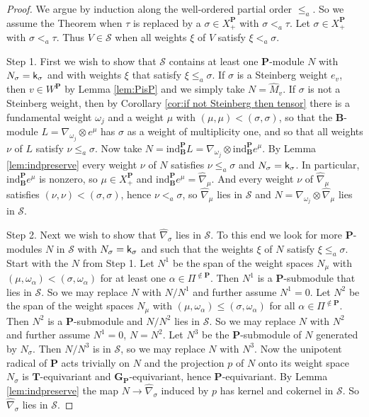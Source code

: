 \documentclass[sn-mathphys-num]{sn-jnl}%
\newcommand\tS{{\mathcal S}}
\newcommand{\ind}{{\mathrm{ind}}}
\newcommand{\sk}{{\sf k}}
\newcommand{\bg}{\mathbf G}
\newcommand{\fb}{\mathbf B}
\newcommand{\bt}{\mathbf T}
\newcommand{\bp}{\mathbf P}
\theoremstyle{definition}
\begin{document}
\begin{proof}
We argue by induction along the well-ordered partial order $\leq_a$. So we assume the Theorem when $\tau$ is replaced by 
a $\sigma\in X_+^\bp$ with $\sigma<_a\tau$. Let $\sigma\in X_+^\bp$ with $\sigma<_a\tau$.
Thus $V\in \tS$ when all weights $\xi$
of $V$ satisfy $\xi<_a\sigma$.

Step 1. First we  wish to show that $\tS$ contains at least one $\bp$-module $N$ with $N_\sigma=\sk_\sigma$ and with weights $\xi$
that satisfy $\xi\leq_a\sigma$.
If $\sigma$ is a Steinberg weight $e_v$, then $v\in W^\bp$ by Lemma \ref{lem:PisP}
and we simply take $N=\hat M_v$.
If $\sigma$ is not a Steinberg weight,  then by Corollary \ref{cor:if not Steinberg then tensor}
 there is a fundamental weight $\omega_j$ and a weight $\mu$ with $(\mu,\mu)<(\sigma,\sigma)$,
 so that the $\fb$-module $L=\nabla_{\omega_j}\otimes e^\mu$  has
$\sigma$ as a weight  of  multiplicity one, and so that all weights  $\nu$ of $L$ satisfy 
$\nu\leq_a\sigma$. Now take $N=\ind_\fb^\bp L=\nabla_{\omega_j}\otimes\ind_\fb^\bp e^\mu$. 
By Lemma \ref{lem:indpreserve} every weight $\nu$ of $N$ satisfies $\nu\leq_a\sigma$ and 
$N_\sigma=\sk_\sigma$. In particular, $\ind_\fb^\bp e^\mu$ is nonzero, so  $\mu\in X^\bp_+$ and $\ind_\fb^\bp e^\mu=\hat\nabla_\mu$.
And every weight $\nu$ of $\hat\nabla_\mu$ satisfies $(\nu,\nu)<(\sigma,\sigma)$, hence $\nu<_a\sigma$, so $\hat\nabla_\mu$  lies in $\tS$ and  
$N=\nabla_{\omega_j}\otimes\hat\nabla_\mu$ lies in $\tS$.

Step 2. Next we wish to show that $\hat\nabla_\sigma$ lies in $\tS$. To this end we look for more $\bp$-modules $N$ 
in $\tS$ with $N_\sigma=\sk_\sigma$ 
and such that the weights $\xi$ of $N$
satisfy $\xi\leq_a\sigma$.
Start with the $N$ from Step 1.
Let $N^1$ be the span of the weight spaces $N_\mu$ with $(\mu,\omega_\alpha)<(\sigma,\omega_\alpha)$ for at least one
$\alpha\in \Pi^{\notin \bp}$. Then $N^1$ is a $\bp$-submodule that lies in $\tS$. So we may replace $N$ with
$N/N^1$ and further assume $N^1=0$. 
Let $N^2$ be the span of the weight spaces $N_\mu$ with $(\mu,\omega_\alpha)\leq(\sigma,\omega_\alpha)$ for all
$\alpha\in \Pi^{\notin \bp}$. Then $N^2$ is a $\bp$-submodule and $N/N^2$ lies in $\tS$. So we may replace $N$ with
$N^2$ and further assume $N^1=0$, $N=N^2$. 
Let $N^3$ be the $\bp$-submodule of $N$ generated by $N_\sigma$.
Then $N/N^3$ is in $\tS$, so we may replace $N$ with $N^3$. Now the unipotent radical of $\bp$ acts trivially
on $N$ and the projection $p$ of $N$ onto its weight space $N_\sigma$ is $\bt$-equivariant and $\bg_\bp$-equivariant,
hence $\bp$-equivariant. By Lemma \ref{lem:indpreserve} the map $N\to \hat\nabla_\sigma$ induced by $p$ has kernel and cokernel in $\tS$. So $\hat\nabla_\sigma$ lies  in $\tS$.



\end{proof}
\end{document}
